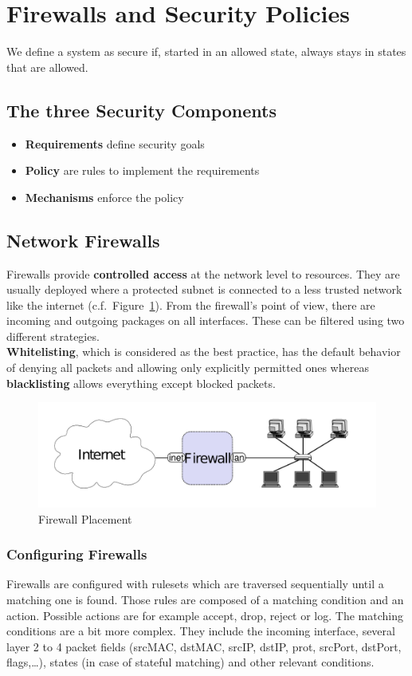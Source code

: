 
\section{Firewalls and Security Policies}
We define a system as secure if, started in an allowed state, always stays in states that are allowed.

\subsection{The three Security Components}
\begin{itemize}
  \item \textbf{Requirements} define security goals
  \item \textbf{Policy} are rules to implement the requirements
  \item \textbf{Mechanisms} enforce the policy
\end{itemize}

\subsection{Network Firewalls}
Firewalls provide \textbf{controlled access} at the network level to resources.
They are usually deployed where a protected subnet is connected to a less trusted network like the internet (c.f.\ Figure~\ref{fig:firewall_placement}).
From the firewall's point of view, there are incoming and outgoing packages on all interfaces.
These can be filtered using two different strategies.\\
\textbf{Whitelisting}, which is considered as the best practice, has the default behavior of denying all packets and allowing only explicitly permitted ones whereas \textbf{blacklisting} allows everything except blocked packets.


\begin{figure}[h]
  \centering
  \includegraphics[width=.8\textwidth]{figures/firewall_placement.png}
  \caption{Firewall Placement}\label{fig:firewall_placement}
\end{figure}

\subsubsection*{Configuring Firewalls}
Firewalls are configured with rulesets which are traversed sequentially until a matching one is found.
Those rules are composed of a matching condition and an action.
Possible actions are for example accept, drop, reject or log.
The matching conditions are a bit more complex.
They include the incoming interface, several layer 2 to 4 packet fields (srcMAC, dstMAC, srcIP, dstIP, prot, srcPort, dstPort, flags,\dots), states (in case of stateful matching) and other relevant conditions.

